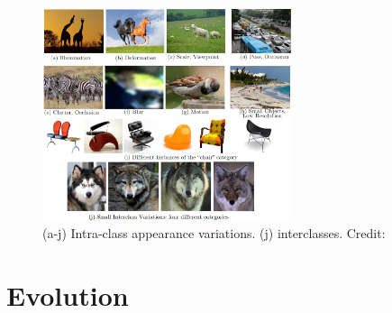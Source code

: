 \documentclass{beamer}
\begin{document}
\begin{frame}
    \begin{figure}
        \includegraphics[width=0.65\textwidth]{images/challenge_example.png}
        \caption{(a-j) Intra-class appearance variations. (j) interclasses.
        \hbox{\scriptsize Credit:}
        }
    \end{figure}
\end{frame}

\section{Evolution}

\end{document}
